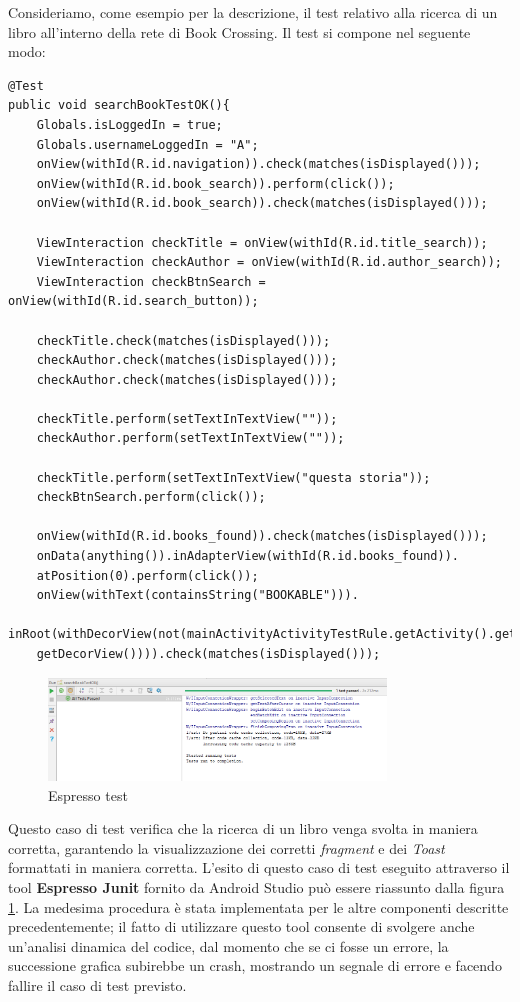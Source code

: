 Consideriamo, come esempio per la descrizione, il test relativo alla ricerca di un libro all'interno della rete di Book Crossing. Il test si compone nel seguente modo:
\begin{lstlisting}
@Test
public void searchBookTestOK(){
	Globals.isLoggedIn = true;
	Globals.usernameLoggedIn = "A";
	onView(withId(R.id.navigation)).check(matches(isDisplayed()));
	onView(withId(R.id.book_search)).perform(click());
	onView(withId(R.id.book_search)).check(matches(isDisplayed()));
	
	ViewInteraction checkTitle = onView(withId(R.id.title_search));
	ViewInteraction checkAuthor = onView(withId(R.id.author_search));
	ViewInteraction checkBtnSearch = onView(withId(R.id.search_button));
	
	checkTitle.check(matches(isDisplayed()));
	checkAuthor.check(matches(isDisplayed()));
	checkAuthor.check(matches(isDisplayed()));
	
	checkTitle.perform(setTextInTextView(""));
	checkAuthor.perform(setTextInTextView(""));
	
	checkTitle.perform(setTextInTextView("questa storia"));
	checkBtnSearch.perform(click());
	
	onView(withId(R.id.books_found)).check(matches(isDisplayed()));
	onData(anything()).inAdapterView(withId(R.id.books_found)).
	atPosition(0).perform(click());
	onView(withText(containsString("BOOKABLE"))).
	inRoot(withDecorView(not(mainActivityActivityTestRule.getActivity().getWindow().
	getDecorView()))).check(matches(isDisplayed()));
\end{lstlisting}

	\begin{figure}[h!]
	\centering
	\includegraphics[width=0.8\textwidth]{Immagini/Test/Espresso.png}
	\caption{Espresso test}
	\label{fig:espresso}
\end{figure}
Questo caso di test verifica che la ricerca di un libro venga svolta in maniera corretta, garantendo la visualizzazione dei corretti \textit{fragment} e dei \textit{Toast} formattati in maniera corretta. L'esito di questo caso di test eseguito attraverso il tool \textbf{Espresso Junit} fornito da Android Studio può essere riassunto dalla figura \ref{fig:espresso}.
La medesima procedura è stata implementata per le altre componenti descritte precedentemente; il fatto di utilizzare questo tool consente di svolgere anche un'analisi dinamica del codice, dal momento che se ci fosse un errore, la successione grafica subirebbe un crash, mostrando un segnale di errore e facendo fallire il caso di test previsto.

